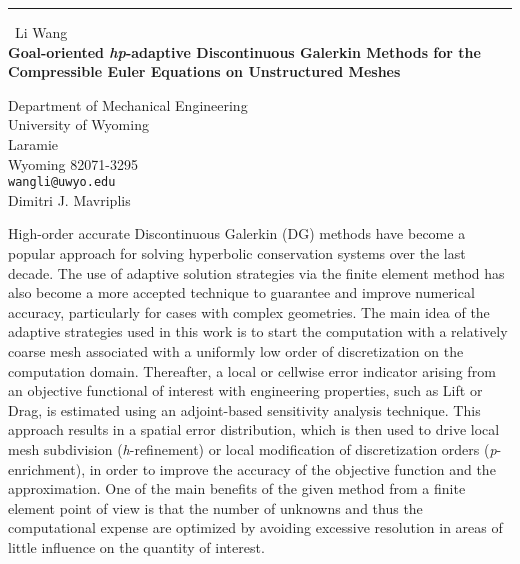 \documentclass{report}
\begin{document}
\begin{center}
\rule{6in}{1pt} \
{\large Li Wang \\
{\bf Goal-oriented \textit{hp}-adaptive Discontinuous Galerkin Methods for the Compressible Euler Equations on Unstructured Meshes}}

Department of Mechanical Engineering \\ University of Wyoming \\ Laramie \\ Wyoming 82071-3295
\\
{\tt wangli@uwyo.edu}\\
Dimitri J. Mavriplis\end{center}

High-order accurate Discontinuous Galerkin (DG) methods
\cite{Cockburn::98_1,Barter::07_1,Nastase::05_1,Wang::07_1}
have become a popular approach for solving hyperbolic conservation
systems over the last decade. The use of adaptive solution strategies via
the finite element method has also become a more accepted technique
to guarantee and improve numerical accuracy, particularly for cases
with complex geometries. The main idea of the adaptive strategies used in
this work is to start the computation with a relatively coarse mesh associated
with a uniformly low order of discretization on the computation domain.
Thereafter, a local or cellwise error indicator arising from an objective
functional of interest with engineering properties, such as Lift or Drag,
is estimated using an adjoint-based sensitivity analysis technique.
This approach results in a spatial error distribution, which is then used
to drive local mesh subdivision (\textit{h}-refinement) or
local modification of discretization orders (\textit{p}-enrichment),
in order to improve the accuracy of the objective function and the approximation.
One of the main benefits of the given method from a finite
element point of view is that the number of unknowns and thus the computational expense
are optimized by avoiding excessive resolution
in areas of little influence on the quantity of interest.
\end{document}
